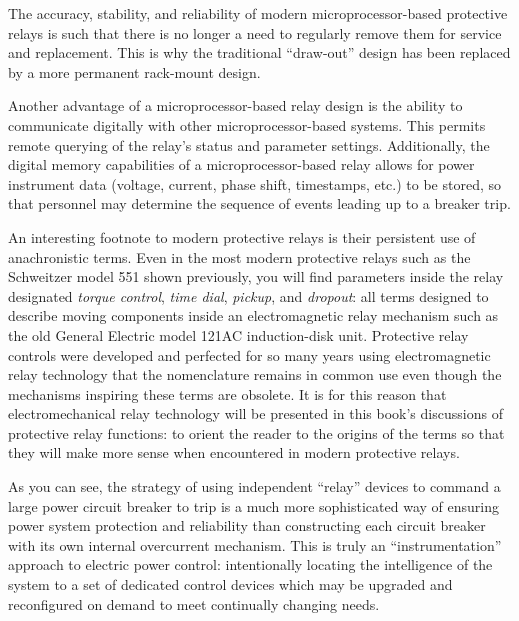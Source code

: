 The accuracy, stability, and reliability of modern microprocessor-based protective relays is such that there is no longer a need to regularly remove them for service and replacement.  This is why the traditional ``draw-out'' design has been replaced by a more permanent rack-mount design.

Another advantage of a microprocessor-based relay design is the ability to communicate digitally with other microprocessor-based systems.  This permits remote querying of the relay's status and parameter settings.  Additionally, the digital memory capabilities of a microprocessor-based relay allows for power instrument data (voltage, current, phase shift, timestamps, etc.) to be stored, so that personnel may determine the sequence of events leading up to a breaker trip.

\vskip 10pt

An interesting footnote to modern protective relays is their persistent use of anachronistic terms.  Even in the most modern protective relays such as the Schweitzer model 551 shown previously, you will find parameters inside the relay designated \textit{torque control}, \textit{time dial}, \textit{pickup}, and \textit{dropout}: all terms designed to describe moving components inside an electromagnetic relay mechanism such as the old General Electric model 121AC induction-disk unit.  Protective relay controls were developed and perfected for so many years using electromagnetic relay technology that the nomenclature remains in common use even though the mechanisms inspiring these terms are obsolete.  It is for this reason that electromechanical relay technology will be presented in this book's discussions of protective relay functions: to orient the reader to the origins of the terms so that they will make more sense when encountered in modern protective relays.

\vskip 10pt

As you can see, the strategy of using independent ``relay'' devices to command a large power circuit breaker to trip is a much more sophisticated way of ensuring power system protection and reliability than constructing each circuit breaker with its own internal overcurrent mechanism.  This is truly an ``instrumentation'' approach to electric power control: intentionally locating the intelligence of the system to a set of dedicated control devices which may be upgraded and reconfigured on demand to meet continually changing needs.







